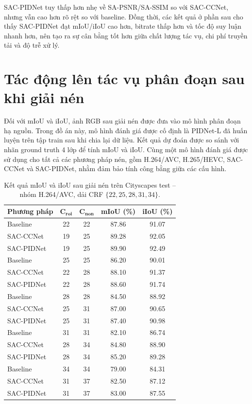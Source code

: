 SAC-PIDNet tuy thấp hơn nhẹ về SA-PSNR/SA-SSIM so với SAC-CCNet, nhưng vẫn cao hơn rõ rệt so với baseline. Đồng thời, các kết quả ở phần sau cho thấy SAC-PIDNet đạt mIoU/iIoU cao hơn, bitrate thấp hơn và tốc độ suy luận nhanh hơn, nên tạo ra sự cân bằng tốt hơn giữa chất lượng tác vụ, chi phí truyền tải và độ trễ xử lý.

\section{Tác động lên tác vụ phân đoạn sau khi giải nén}
\label{sec:downstream-segmentation}

Đối với mIoU và iIoU, ảnh RGB sau giải nén được đưa vào mô hình phân đoạn hạ nguồn. Trong đồ án này, mô hình đánh giá được cố định là PIDNet-L đã huấn luyện trên tập train sau khi chia lại dữ liệu. Kết quả dự đoán được so sánh với nhãn ground truth 4 lớp để tính mIoU và iIoU. Cùng một mô hình đánh giá được sử dụng cho tất cả các phương pháp nén, gồm H.264/AVC, H.265/HEVC, SAC-CCNet và SAC-PIDNet, nhằm đảm bảo tính công bằng giữa các cấu hình.

\begin{table}[H]
\centering
\caption{Kết quả mIoU và iIoU sau giải nén trên Cityscapes test -- nhóm H.264/AVC,
         dải CRF $\{22,25,28,31,34\}$.}
\label{tab:miou-iiou-x264}
\small
\begin{tabular}{p{}cccc}
\toprule
\textbf{Phương pháp} & $\boldsymbol{C_{roi}}$ & $\boldsymbol{C_{non}}$
    & \textbf{mIoU (\%)} & \textbf{iIoU (\%)} \\
\midrule
Baseline  & 22 & 22 & 87.86 & 91.07 \\
SAC-CCNet & 19 & 25 & 89.28 & 92.05 \\
SAC-PIDNet & 19 & 25 & 89.90 & 92.49 \\
\midrule
Baseline  & 25 & 25 & 86.20 & 90.01 \\
SAC-CCNet & 22 & 28 & 88.10 & 91.37 \\
SAC-PIDNet & 22 & 28 & 88.60 & 91.74 \\
\midrule
Baseline  & 28 & 28 & 84.50 & 88.92 \\
SAC-CCNet & 25 & 31 & 87.00 & 90.65 \\
SAC-PIDNet & 25 & 31 & 87.40 & 90.98 \\
\midrule
Baseline  & 31 & 31 & 82.10 & 86.74 \\
SAC-CCNet & 28 & 34 & 84.80 & 88.90 \\
SAC-PIDNet & 28 & 34 & 85.20 & 89.28 \\
\midrule
Baseline  & 34 & 34 & 79.00 & 84.31 \\
SAC-CCNet & 31 & 37 & 82.50 & 87.12 \\
SAC-PIDNet & 31 & 37 & 83.00 & 87.55 \\
\bottomrule
\end{tabular}
\end{table}

